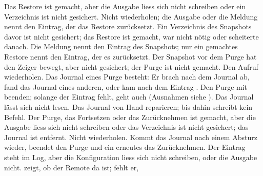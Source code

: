 \stopxrow
\startxrow
\startxcell[width=0.26\textwidth] \dontleavehmode\hbox{} \stopxcell
\startxcell[width=0.35\textwidth] Das Restore ist gemacht,
aber die Ausgabe liess sich nicht schreiben oder ein Verzeichnis ist nicht gesichert. \stopxcell
\startxcell Nicht wiederholen;
die Ausgabe oder die Meldung nennt den Eintrag, der das Restore zurücksetzt. \stopxcell
\stopxrow
\startxrow
\startxcell[width=0.26\textwidth] \dontleavehmode\hbox{} \stopxcell
\startxcell[width=0.35\textwidth] Ein Verzeichnis des Snapshots davor ist nicht gesichert;
das Restore ist gemacht, war nicht nötig oder scheiterte danach. \stopxcell
\startxcell Die Meldung nennt den Eintrag des Snapshots;
nur ein gemachtes Restore nennt den Eintrag, der es zurücksetzt. \stopxcell
\stopxrow
\startxrow
\startxcell[width=0.26\textwidth]  \stopxcell
\startxcell[width=0.35\textwidth] Der Snapshot vor dem Purge hat den Zeiger bewegt,
aber nicht gesichert; der Purge ist nicht gemacht. \stopxcell
\startxcell Den Aufruf wiederholen. \stopxcell
\stopxrow
\startxrow
\startxcell[width=0.26\textwidth]  \stopxcell
\startxcell[width=0.35\textwidth] Das Journal eines Purge besteht:
Er brach nach dem Journal ab,  fand das Journal eines anderen,
oder  kam nach dem Eintrag . \stopxcell
\startxcell Den Purge mit \hbox{} beenden;
solange der Eintrag fehlt, geht auch \hbox{}
(Ausnahmen siehe ). \stopxcell
\stopxrow
\startxrow
\startxcell[width=0.26\textwidth]  \stopxcell
\startxcell[width=0.35\textwidth] Das Journal lässt sich nicht lesen. \stopxcell
\startxcell Das Journal von Hand reparieren; bis dahin schreibt kein Befehl. \stopxcell
\stopxrow
\startxrow
\startxcell[width=0.26\textwidth]  \stopxcell
\startxcell[width=0.35\textwidth] Der Purge, das Fortsetzen oder das Zurücknehmen ist gemacht,
aber die Ausgabe liess sich nicht schreiben oder das Verzeichnis ist nicht gesichert;
das Journal ist entfernt. \stopxcell
\startxcell Nicht wiederholen.
Kommt das Journal nach einem Absturz wieder,
beendet \hbox{} den Purge
und ein erneutes \hbox{} das Zurücknehmen. \stopxcell
\stopxrow
\startxrow
\startxcell[width=0.26\textwidth] \dontleavehmode\hbox{} \stopxcell
\startxcell[width=0.35\textwidth] Der Eintrag  steht im Log,
aber die Konfiguration liess sich nicht schreiben, oder die Ausgabe nicht. \stopxcell
\startxcell {} zeigt, ob der Remote da ist; fehlt er,
